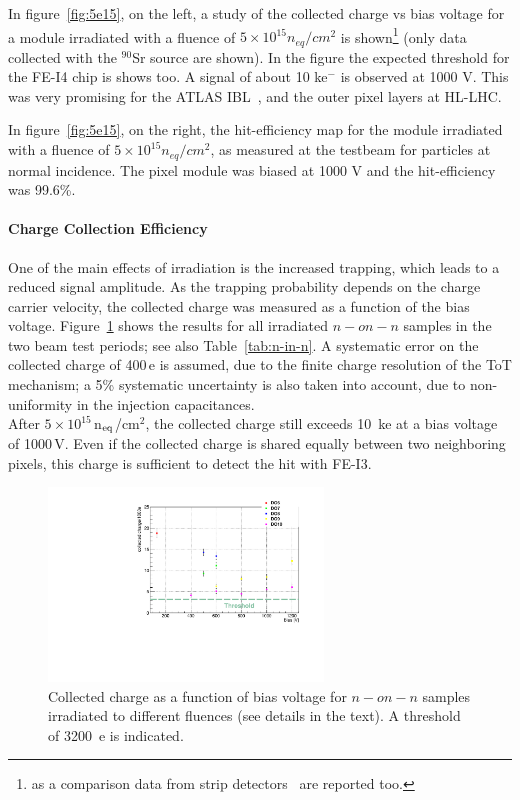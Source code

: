 In figure~\ref{fig:5e15}, on the left, a study of the collected charge vs bias voltage
 for a module irradiated with a fluence of $5\times 10^{15} n_{eq}/cm^{2}$ is shown\footnote{as
 a comparison data from strip detectors~\cite{Casse} are reported too.} (only data collected with the
 $^{90}$Sr  source are shown).  In the figure the expected threshold for the FE-I4
 chip is shows too. A signal of about 10 ke$^-$ is observed at 1000 V. This was very
 promising for the  ATLAS IBL~\cite{IBLTDR}, and
  the outer pixel layers at HL-LHC.

In figure~\ref{fig:5e15}, on the right, the hit-efficiency map for the module irradiated with a
fluence of $5\times 10^{15} n_{eq}/cm^{2}$, as measured at the testbeam for particles
at normal incidence. The pixel module was biased at 1000 V and the hit-efficiency was 99.6\%.


\paragraph{Charge Collection Efficiency}
One of the main effects of irradiation is the increased trapping, which leads to a reduced signal amplitude. 
As the trapping probability depends on the charge carrier velocity, the collected charge was measured as a 
function of the bias voltage. Figure~\ref{fig:DO_all_Save} shows the results for all irradiated $n-on-n$ 
samples in the two beam test periods; see also Table~\ref{tab:n-in-n}. A systematic error on the collected 
charge of 400\,e is assumed, due to the finite charge resolution of the ToT mechanism;  a 5\% systematic 
uncertainty is also taken into account, due to non-uniformity in the injection capacitances.\\
After $5\times 10^{15}$\,n$_{\rm eq}$/cm$^2$, the collected charge still exceeds 10~ke at a bias voltage of 
1000\,V. Even if the collected charge is shared equally between two neighboring pixels, this charge is 
sufficient to detect the hit with FE-I3.

\begin{figure}[!htpb]
 \begin{center}
  \includegraphics[width=0.65\textwidth]{DO_all_Save.pdf}
 \end{center}
 \caption{\label{fig:DO_all_Save}Collected charge as a function of bias voltage for $n-on-n$ samples irradiated to different fluences
 (see details in the text).
 A threshold of 3200~e is indicated.}
\end{figure}

